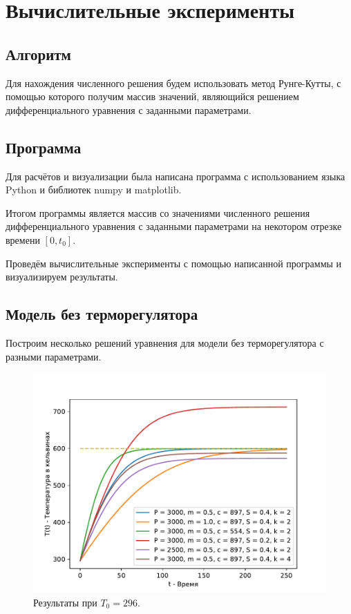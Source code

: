 \section{Вычислительные эксперименты}
    \subsection{Алгоритм}
        Для нахождения численного решения будем использовать метод Рунге-Кутты, с помощью которого получим массив значений, являющийся решением дифференциального уравнения с заданными параметрами.

    \subsection{Программа}
        Для расчётов и визуализации была написана программа с использованием языка Python и библиотек numpy и matplotlib.

        

        Итогом программы является массив со значениями численного решения дифференциального уравнения с заданными параметрами на некотором отрезке времени $ [0, t_0] $.

        Проведём вычислительные эксперименты с помощью написанной программы и визуализируем результаты.


    \subsection{Модель без терморегулятора}
        Построим несколько решений уравнения для модели без терморегулятора с разными параметрами.

        \begin{figure}[H]
            \centering
            \includegraphics[width=17cm]{pictures/utug1.pdf}
            \caption{Результаты при $T_0 = 296$.} \label{model}
        \end{figure}

